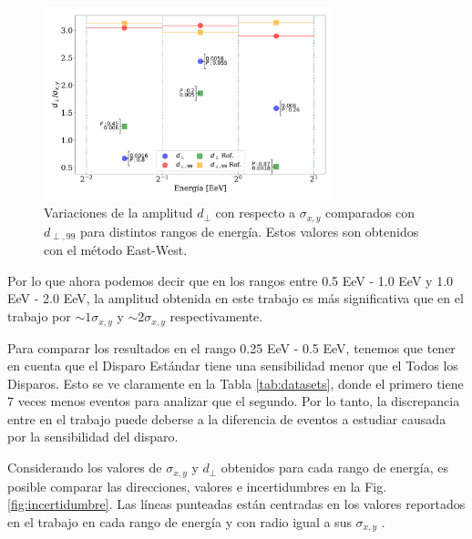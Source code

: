     \begin{figure}[H]
        \begin{small}
            \begin{center}
                \includegraphics[width=0.75\textwidth]{d_perp_normalizado_sigmas_v5.pdf}
            \end{center}
            \caption{Variaciones de la amplitud $d_\perp$ con respecto a $\sigma_{x,y}$ comparados con $d_{\perp,99}$ para distintos rangos de energía. Estos valores son obtenidos con el método East-West. }
            \label{fig:normalizado_sigma}
        \end{small}
    \end{figure}

Por lo que ahora podemos decir que en los rangos entre 0.5 EeV - 1.0 EeV y 1.0 EeV - 2.0 EeV, la amplitud obtenida en este trabajo es más significativa que en el trabajo \cite{Aab_2020} por $\sim 1\sigma_{x,y}$ y $\sim 2 \sigma_{x,y}$ respectivamente.

Para comparar los resultados en el  rango 0.25 EeV - 0.5 EeV, tenemos que tener en cuenta que el Disparo Estándar tiene una sensibilidad menor que el Todos los Disparos. Esto se ve claramente en la Tabla \ref{tab:datasets}, donde el primero tiene 7 veces menos eventos para analizar que el segundo. Por lo tanto, la discrepancia entre en el trabajo \cite{Aab_2020} puede deberse a la  diferencia de eventos a estudiar causada por la sensibilidad del disparo.


Considerando los valores de $\sigma_{x,y}$ y $d_\perp$ obtenidos para cada rango de energía, es posible  comparar las direcciones, valores e incertidumbres en la Fig.\ref{fig:incertidumbre}. Las líneas punteadas están centradas en los valores reportados en el trabajo \cite{Aab_2020} en cada rango de energía y con radio igual a sus $\sigma_{x,y}$ . 

